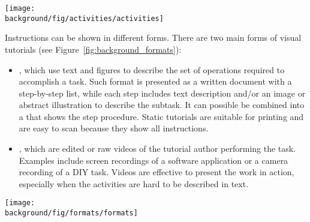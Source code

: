 \begin{figure*}[t]
  \centering
  \begin{minipage}{\textwidth}
  \texttt{[image: \\background/fig/activities/activities]}
  \caption[activities]{Example activities in tutorial domains:
  a) image manipulations using a software application
  \footnote{Photoshop Playbook: Selective Focus, \url{https://youtu.be/Wh3ahxqDnyw}},
  b) wrapping a gift, a DIY task
  \footnote{One Kings Lane: How to Wrap the Perfect Gift, \url{https://youtu.be/Me3ykrZobJE}},
  c) cooking, an everyday activity
  \footnote{Slow-cooked black treacle ham, \url{http://www.bbc.co.uk/food/recipes/slow-cooked_black_21152}}, and
  d) ballet dancing in sports
  \footnote{Ballet 101: How to Do the Fouette in Ballet Dancing, \url{https://youtu.be/DzqQNlaahjs}}.
  }
  \label{fig:background_activities}
  \end{minipage}
\end{figure*}


Instructions can be shown in different forms. There are two main forms of visual tutorials (see Figure~\ref{fig:background_formats}):
\begin{itemize}
  \itemsep -2pt
  \item {}, which use text and figures to describe the set of operations required to accomplish a task. Such format is presented as a written document with a step-by-step list, while each step includes text description and/or an image or abstract illustration to describe the subtask. It can possible be combined into a  that shows the step procedure. Static tutorials are suitable for printing and are easy to scan because they show all instructions.
  \item {}, which are edited or raw videos of the tutorial author performing the task. Examples include screen recordings of a software application or a camera recording of a DIY task. Videos are effective to present the work in action, especially when the activities are hard to be described in text.
\end{itemize}

\begin{figure*}[th!]
  \centering
  \begin{minipage}{\textwidth}
  \texttt{[image: \\background/fig/formats/formats]}
  \caption[formats]{Major tutorial forms:
  a) Step-by-step static tutorials show a list of steps, each with text and figure(s) that describe a subtask
  \footnote{Combine photos on the go, \url{https://helpx.adobe.com/mobile-apps/how-to/combine-photos-photoshop-mix.html}}, and
  b) video tutorials show an author performing the task, which can be reviewed via a video player
  \footnote{Change the color of an object, \url{https://helpx.adobe.com/photoshop/how-to/change-color-object-photoshop.html}}.
  }
  \label{fig:background_formats}
  \end{minipage}
\end{figure*}

